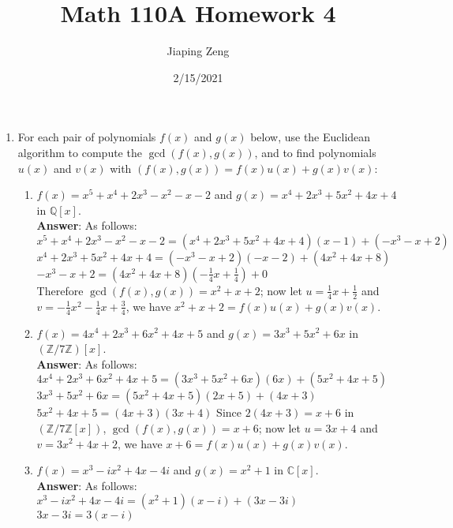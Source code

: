 \documentclass{article}
\title{Math 110A Homework 4}
\date{2/15/2021}
\author{Jiaping Zeng}
\begin{document}
\maketitle

\begin{enumerate}
      \item For each pair of polynomials $f(x)$ and $g(x)$ below, use the Euclidean algorithm to compute the $\gcd(f(x),g(x))$, and to find polynomials $u(x)$ and $v(x)$ with $(f(x),g(x))=f(x)u(x)+g(x)v(x)$:
            \begin{enumerate}[start=2]
                  \item $f(x)=x^5+x^4+2x^3-x^2-x-2$ and $g(x)=x^4+2x^3+5x^2+4x+4$ in $\mathbb{Q}[x]$.\\
                        \textbf{Answer}: As follows:\\
                        $x^5+x^4+2x^3-x^2-x-2=(x^4+2x^3+5x^2+4x+4)(x-1)+(-x^3-x+2)$\\
                        $x^4+2x^3+5x^2+4x+4=(-x^3-x+2)(-x-2)+(4x^2+4x+8)$\\
                        $-x^3-x+2=(4x^2+4x+8)(-\frac{1}{4}x+\frac{1}{4})+0$\\
                        Therefore $\gcd(f(x),g(x))=x^2+x+2$; now let $u=\frac{1}{4}x+\frac{1}{2}$ and $v=-\frac{1}{4}x^2-\frac{1}{4}x+\frac{3}{4}$, we have $x^2+x+2=f(x)u(x)+g(x)v(x)$.
                  \item $f(x)=4x^4+2x^3+6x^2+4x+5$ and $g(x)=3x^3+5x^2+6x$ in $(\mathbb{Z}/7\mathbb{Z})[x]$.\\
                        \textbf{Answer}: As follows:\\
                        $4x^4+2x^3+6x^2+4x+5=(3x^3+5x^2+6x)(6x)+(5x^2+4x+5)$\\
                        $3x^3+5x^2+6x=(5x^2+4x+5)(2x+5)+(4x+3)$\\
                        $5x^2+4x+5=(4x+3)(3x+4)$
                        Since $2(4x+3)=x+6$ in $(\mathbb{Z}/7\mathbb{Z}[x])$, $\gcd(f(x),g(x))=x+6$; now let $u=3x+4$ and $v=3x^2+4x+2$, we have $x+6=f(x)u(x)+g(x)v(x)$.
                  \item $f(x)=x^3-ix^2+4x-4i$ and $g(x)=x^2+1$ in $\mathbb{C}[x]$.\\
                        \textbf{Answer}: As follows:\\
                        $x^3-ix^2+4x-4i=(x^2+1)(x-i)+(3x-3i)$\\
                        $3x-3i=3(x-i)$\\

\end{enumerate}
\end{enumerate}
\end{document}
